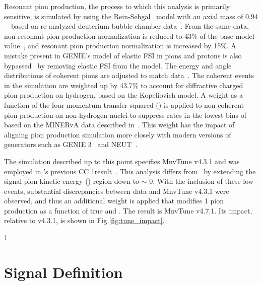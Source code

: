 \documentclass[aps,prl,twocolumn,showpacs,superscriptaddress,letterpaper,showkeys,superscriptaddress,floatfix,nofootinbib]{revtex4-1}
\newcommand{\showSections}[0]{0}
\begin{document}
Resonant pion production, the process to which this analysis is primarily sensitive, is simulated by using the Rein-Sehgal~\cite{Rein:1980wg} model with an axial mass of 0.94 \GeVcsq---based on re-analyzed deuterium bubble chamber data~\cite{Rodrigues:2016xjj,Mislivec:2017qfz}. From the same data, non-resonant pion production normalization is reduced to 43\% of the base model value~\cite{Rodrigues:2016xjj}, and resonant pion production normalization is increased by 15\%. A mistake present in GENIE's model of elastic FSI in pions and protons is also bypassed~\cite{Harewood:2019rzy} by removing elastic FSI from the model. The energy and angle distributions of coherent pions are adjusted to match \minerva data~\cite{PhysRevLett.131.051801}. The coherent events in the simulation are weighted up by 43.7\% to account for diffractive charged pion production on hydrogen, based on the Kopeliovich \cite{Kopeliovich:2012tu} model. A weight as a function of the four-momentum transfer squared (\Qsq) is applied to non-coherent pion production on non-hydrogen nuclei to suppress rates in the lowest bins of \Qsq based on the MINERvA data described in~\cite{Bercellie.131.011801}. This weight has the impact of aligning pion production simulation more closely with modern versions of generators such as GENIE 3~\cite{Andreopoulos201087} and NEUT~\cite{Hayato:2009zz}.

The simulation described up to this point specifies MnvTune v4.3.1 and was employed in \minerva's previous CC 1\pip result~\cite{Bercellie.131.011801}. This analysis differs from~\cite{Bercellie.131.011801} by extending the signal pion kinetic energy (\Tpi) region down to \Tpi $\sim$ 0. With the inclusion of these low-\Tpi events, substantial discrepancies between data and MnvTune v4.3.1 were observed, and thus an additional weight is applied that modifies 1 pion production as a function of true \Tpi and \Qsq. The result is MnvTune v4.7.1. Its impact, relative to v4.3.1, is shown in Fig.\ref{fig:tune_impact}.

\if\showSections1 \section{Signal Definition} \fi
\end{document}
